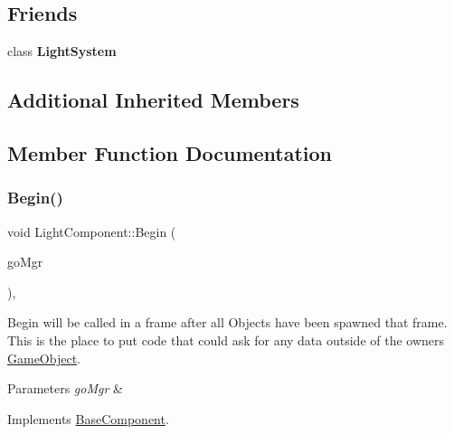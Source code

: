\subsection*{Friends}
\begin{DoxyCompactItemize}
\item 
\mbox{\label{classLightComponent_acad5260b1bd2b9cbfe38d8f2471f072b}} 
class {\bfseries Light\+System}
\end{DoxyCompactItemize}
\subsection*{Additional Inherited Members}


\subsection{Member Function Documentation}
\mbox{\label{classLightComponent_a5cb42a615fc057b75e003e69aee729ef}} 
\subsubsection{\texorpdfstring{Begin()}{Begin()}}
{\footnotesize\ttfamily void Light\+Component\+::\+Begin (\begin{DoxyParamCaption}\item[{\hyperlink{classGameObjectManager}{Game\+Object\+Manager} $\ast$}]{go\+Mgr }\end{DoxyParamCaption})\hspace{0.3cm}{\ttfamily [override]}, {\ttfamily [virtual]}}



Begin will be called in a frame after all Objects have been spawned that frame. This is the place to put code that could ask for any data outside of the owner\textquotesingle{}s \hyperlink{classGameObject}{Game\+Object}. 


\begin{DoxyParams}{Parameters}
{\em go\+Mgr} & \\
\hline
\end{DoxyParams}


Implements \hyperlink{classBaseComponent}{Base\+Component}.

\mbox{\label{classLightComponent_abb4382140092cd7b54f3cf1d37a31c7b}} 
